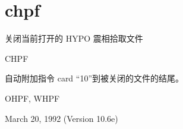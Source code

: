 \section{chpf}
\label{cmd:chpf}

关闭当前打开的 HYPO 震相拾取文件

CHPF

自动附加指令 card ``10''到被关闭的文件的结尾。

OHPF, WHPF

March 20, 1992 (Version 10.6e)


